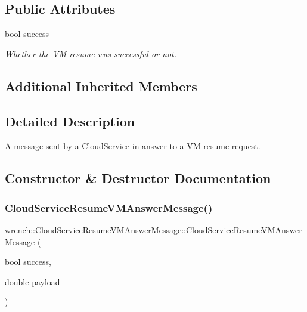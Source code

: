 \subsection*{Public Attributes}
\begin{DoxyCompactItemize}
\item 
\mbox{\label{classwrench_1_1_cloud_service_resume_v_m_answer_message_a695d0eb362c0ba59d81f17b34e9e36f9}} 
bool \hyperlink{classwrench_1_1_cloud_service_resume_v_m_answer_message_a695d0eb362c0ba59d81f17b34e9e36f9}{success}
\begin{DoxyCompactList}\small\item\em Whether the VM resume was successful or not. \end{DoxyCompactList}\end{DoxyCompactItemize}
\subsection*{Additional Inherited Members}


\subsection{Detailed Description}
A message sent by a \hyperlink{classwrench_1_1_cloud_service}{Cloud\+Service} in answer to a VM resume request. 

\subsection{Constructor \& Destructor Documentation}
\mbox{\label{classwrench_1_1_cloud_service_resume_v_m_answer_message_a025748d3981a3e5cbc1661bf82e1a92f}} 
\subsubsection{\texorpdfstring{Cloud\+Service\+Resume\+V\+M\+Answer\+Message()}{CloudServiceResumeVMAnswerMessage()}}
{\footnotesize\ttfamily wrench\+::\+Cloud\+Service\+Resume\+V\+M\+Answer\+Message\+::\+Cloud\+Service\+Resume\+V\+M\+Answer\+Message (\begin{DoxyParamCaption}\item[{bool}]{success,  }\item[{double}]{payload }\end{DoxyParamCaption})}



